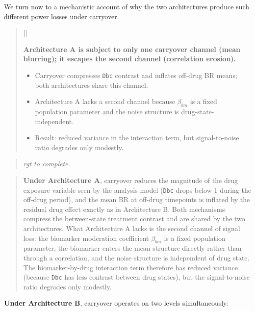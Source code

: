 \documentclass[
  11pt,
]{article}
\newcounter{pgraph}
\newenvironment{bullets}{%
  \stepcounter{pgraph}%
  \begin{quote}\small\sffamily\color[gray]{0.30}%
  {\normalfont\scriptsize\color[gray]{0.58}[\thepgraph]\enspace}}{%
  \end{quote}}
\newenvironment{rgt}{%
  \begin{quote}\small\itshape\color[RGB]{20,60,160}}{%
  \end{quote}}
\newenvironment{orig}{%
  \begin{quote}\normalsize\color[gray]{0.55}}{%
  \end{quote}}
\begin{document}
We turn now to a mechanistic account of why the two architectures
produce such different power losses under carryover.

\begin{bullets}

\textbf{Architecture A is subject to only one carryover
channel (mean blurring); it escapes the second channel
(correlation erosion).}

\begin{itemize}\setlength{\itemsep}{2pt}\setlength{\parskip}{0pt}
\item Carryover compresses \texttt{Dbc} contrast and inflates
  off-drug BR means; both architectures share this channel.
\item Architecture A lacks a second channel because $\beta_{bm}$
  is a fixed population parameter and the noise structure is
  drug-state-independent.
\item Result: reduced variance in the interaction term, but
  signal-to-noise ratio degrades only modestly.
\end{itemize}

\end{bullets}

\begin{rgt}
rgt to complete.

\end{rgt}

\begin{orig}
\textbf{Under Architecture A}, carryover reduces the magnitude of the
drug exposure variable seen by the analysis model (\texttt{Dbc} drops
below 1 during the off-drug period), and the mean BR at off-drug
timepoints is inflated by the residual drug effect exactly as in
Architecture B. Both mechanisms compress the between-state treatment
contrast and are shared by the two architectures. What Architecture A
lacks is the second channel of signal loss: the biomarker moderation
coefficient \(\beta_{bm}\) is a fixed population parameter, the
biomarker enters the mean structure directly rather than through a
correlation, and the noise structure is independent of drug state. The
biomarker-by-drug interaction term therefore has reduced variance
(because \texttt{Dbc} has less contrast between drug states), but the
signal-to-noise ratio degrades only modestly.

\end{orig}

\textbf{Under Architecture B}, carryover operates on two levels
simultaneously:
\end{document}

